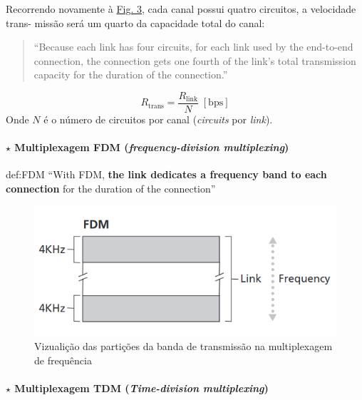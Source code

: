 \vspace{1 em}
\noindent Recorrendo novamente à \hyperref[fig:circuitswitching]{Fig. 3}, cada canal possui quatro circuitos, a velocidade trans- missão será um quarto da capacidade total do canal:

\begin{quote}
    ``Because each link has four circuits, for each link used by the end-to-end connection, the connection gets one fourth of the link’s total transmission capacity for the duration of the connection.''\cite{Kurose2017}
\end{quote}
$$
   \boxed{R_{\text{trans}} = \dfrac{R_{\text{link}}}{N}\; [\text{bps}]}
$$
\noindent Onde $N$ é o número de circuitos por canal (\textit{circuits} por \textit{link}).

\clearpage
\paragraph[1.2.1.1 Multiplexagem FDM]{$\pmb{\star}$ Multiplexagem FDM (\textit{frequency-division multiplexing})}\mbox{}

\begin{theo}{def:FDM}\label{def:FDM}
    ``With FDM, \textbf{the link dedicates a frequency band to each connection} for the duration of the connection''\cite{Kurose2017}
\end{theo}

\vspace{-0.75em}
\begin{figure}[H]
    \centering
    \includegraphics[width = 0.7\linewidth]{img/1/FDM.png}
    \caption{Vizualição das partições da banda de transmissão na multiplexagem de frequência}
    \label{fig:FDM}
\end{figure}

\paragraph[1.2.1.2 Multiplexagem TDM]{$\pmb{\star}$ Multiplexagem TDM (\textit{Time-division multiplexing})}\mbox{}

